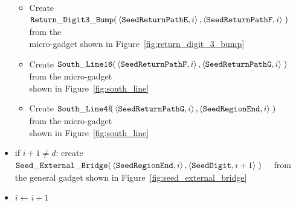 \begin{itemize}
\begin{itemize}
        \item Create
        $\begin{aligned}[t]
            {\tt Return\_Digit3\_Bump}(&\left\langle {\tt SeedReturnPathE}, i \right\rangle,
                                        \left\langle {\tt SeedReturnPathF}, i \right\rangle \;)
        \end{aligned}$ from the\\micro-gadget shown in Figure~\ref{fig:return_digit_3_bump}

        \item Create
        $\begin{aligned}[t]
            {\tt South\_Line16}(&\left\langle {\tt SeedReturnPathF}, i \right\rangle,
                                 \left\langle {\tt SeedReturnPathG}, i \right\rangle \;)
        \end{aligned}$ from the micro-gadget\\shown in Figure~\ref{fig:south_line}

        \item Create
        $\begin{aligned}[t]
            {\tt South\_Line4\textit{l}}(&\left\langle {\tt SeedReturnPathG}, i \right\rangle,
                                          \left\langle {\tt SeedRegionEnd},   i \right\rangle \;)
        \end{aligned}$ from the micro-gadget\\shown in Figure~\ref{fig:south_line}
    \end{itemize}

    \item if $i + 1\not=d$: create
    $\begin{aligned}[t]
        {\tt Seed\_External\_Bridge}(&\left\langle {\tt SeedRegionEnd}, i \right\rangle,
                                      \left\langle {\tt SeedDigit}, i + 1\right\rangle \;)
    \end{aligned}$ from the general gadget shown in Figure~\ref{fig:seed_external_bridge}

    \item $i \gets i + 1$

\end{itemize}


